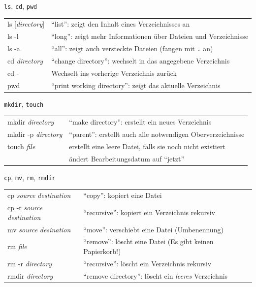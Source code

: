 \begin{frame}{\texttt{ls}, \texttt{cd}, \texttt{pwd}}
  \begin{tabu}{>{\ttfamily}l X[,L]}
    ls [\textit{directory}] & \enquote{list}: zeigt den Inhalt eines Verzeichnisses an \\
    ls -l                   & \enquote{long}: zeigt mehr Informationen über Dateien und Verzeichnisse \\
    ls -a                   & \enquote{all}: zeigt auch versteckte Dateien (fangen mit \texttt{.} an) \\
    cd \textit{directory} & \enquote{change directory}: wechselt in das angegebene Verzeichnis\\
    cd - & Wechselt ins vorherige Verzeichnis zurück \\
    pwd                   & \enquote{print working directory}: zeigt das aktuelle Verzeichnis \\
  \end{tabu}
\end{frame}

\begin{frame}{\texttt{mkdir}, \texttt{touch}}
  \begin{tabu}{>{\ttfamily}l X[,L]}
    mkdir \textit{directory}    & \enquote{make directory}: erstellt ein neues Verzeichnis \\
    mkdir -p \textit{directory} & \enquote{parent}: erstellt auch alle notwendigen Oberverzeichnisse \\
    touch \textit{file}         & erstellt eine leere Datei, falls sie noch nicht existiert \\
                                & ändert Bearbeitungsdatum auf \enquote{jetzt}
  \end{tabu}
\end{frame}

\begin{frame}{\texttt{cp}, \texttt{mv}, \texttt{rm}, \texttt{rmdir}}
  \begin{tabu}{>{\ttfamily}l X[,L]}
    cp \textit{source} \textit{destination}    & \enquote{copy}: kopiert eine Datei \\
    cp -r \textit{source} \textit{destination} & \enquote{recursive}: kopiert ein Verzeichnis rekursiv \\
    mv \textit{source} \textit{desination}     & \enquote{move}: verschiebt eine Datei (Umbenennung) \\
    rm \textit{file}                           & \enquote{remove}: löscht eine Datei (Es gibt keinen Papierkorb!) \\
    rm -r \textit{directory}                   & \enquote{recursive}: löscht ein Verzeichnis rekursiv \\
    rmdir \textit{directory}                   & \enquote{remove directory}: löscht ein \emph{leeres} Verzeichnis
  \end{tabu}
\end{frame}


